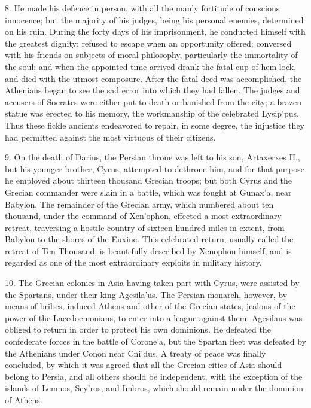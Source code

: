 \documentclass[openany,a4paper]{memoir}
\begin{document}
8. He made his defence in person, with all the manly fortitude of conscious innocence; but the majority of his judges, 
being his personal enemies, determined on his ruin. During 
the forty days of his imprisonment, he conducted himself with 
the greatest dignity; refused to escape when an opportunity 
offered; conversed with his friends on subjects of moral 
philosophy, particularly the immortality of the soul; and 
when the appointed time arrived drank the fatal cup of hem
lock, and died with the utmost composure. After the fatal 
deed was accomplished, the Athenians began to see the sad 
error into which they had fallen. The judges and accusers 
of Socrates were either put to death or banished from the 
city; a brazen statue was erected to his memory, the workmanship of the celebrated Lysip'pus. Thus these fickle ancients endeavored to repair, in some degree, the injustice they 
had permitted against the most virtuous of their citizens. 

9. On the death of Darius, the Persian throne was left to 
his son, Artaxerxes II., but his younger brother, Cyrus, attempted to dethrone him, and for that purpose he employed 
about thirteen thousand Grecian troops; but both Cyrus and 
the Grecian commander were slain in a battle, which was 
fought at Gunax'a, near Babylon. The remainder of the 
Grecian army, which numbered about ten thousand, under 
the command of Xen'ophon, effected a most extraordinary 
retreat, traversing a hostile country of sixteen hundred miles 
in extent, from Babylon to the shores of the Euxine. This 
celebrated return, usually called the retreat of Ten Thousand, 
is beautifully described by Xenophon himself, and is regarded 
as one of the most extraordinary exploits in military history. 

10. The Grecian colonies in Asia having taken part with 
Cyrus, were assisted by the Spartans, under their king 
Agesila'us. The Persian monarch, however, by means of 
bribes, induced Athens and other of the Grecian states, jealous of the power of the Lacedoemonians, to enter into a 
league against them. Agesilaus was obliged to return in 
order to protect his own dominions. He defeated the confederate forces in the battle of Corone'a, but the Spartan 
fleet was defeated by the Athenians under Conon near 
Cni'dus. A treaty of peace was finally concluded, by which 
it was agreed that all the Grecian cities of Asia should belong to Persia, and all others should be independent, with 
the exception of the islands of Lemnos, Scy'ros, and Imbros, 
which should remain under the dominion of Athens. 
\end{document}
